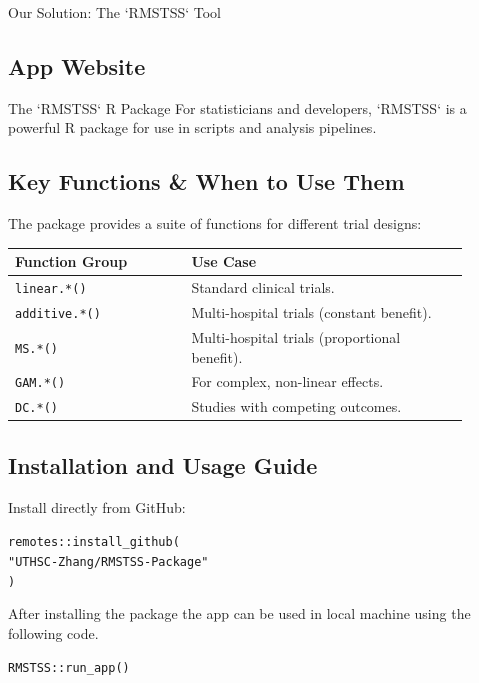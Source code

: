\documentclass[a0,landscape]{a0poster}
\begin{document}
\begin{minipage}[t]{0.34\linewidth}
\begin{posterbox}{Our Solution: The `RMSTSS` Tool}
  \subsection*{\huge App Website}
    \begin{center}
    \end{center}
\end{posterbox}

\end{minipage}
\hfill %
\begin{minipage}[t]{0.32\linewidth} %

\begin{posterbox}{The `RMSTSS` R Package}
    \Large
    For statisticians and developers, `RMSTSS` is a powerful R package for use in scripts and analysis pipelines.
    
    \subsection*{\huge Key Functions \& When to Use Them}
    \Large
    The package provides a suite of functions for different trial designs:
    
    \vspace{0.5cm}
    \begin{tabular}{|p{0.35\linewidth}|p{0.55\linewidth}|}
        \hline
        \textbf{\large Function Group} & \textbf{\large Use Case} \\
        \hline
        \texttt{linear.*()} & Standard clinical trials. \\ \hline
        \texttt{additive.*()} & Multi-hospital trials (constant benefit). \\ \hline
        \texttt{MS.*()} & Multi-hospital trials (proportional benefit). \\ \hline
        \texttt{GAM.*()} & For complex, non-linear effects. \\ \hline
        \texttt{DC.*()} & Studies with competing outcomes. \\
        \hline
    \end{tabular}

    \subsection*{\huge Installation and Usage Guide}
    \Large
    Install directly from GitHub:
    \begin{alltt}
remotes::install_github(
"UTHSC-Zhang/RMSTSS-Package"
)
    \end{alltt}
  \Large
  After installing the package the app can be used in local machine using the following code.
      \begin{alltt}
             RMSTSS::run_app()
    \end{alltt}
    

\end{posterbox}
\end{minipage}
\end{document}
